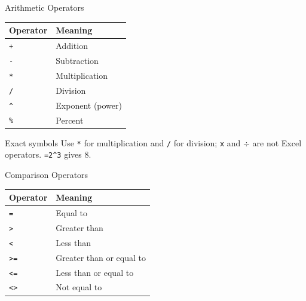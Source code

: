\documentclass[aspectratio=169]{beamer}
\begin{document}
\begin{frame}{Arithmetic Operators}
  \begin{center}
    \begin{tabular}{p{}p{}}
      \toprule
      \textbf{Operator} & \textbf{Meaning} \\
      \midrule
      \texttt{+} & Addition \\
      \texttt{-} & Subtraction \\
      \texttt{*} & Multiplication \\
      \texttt{/} & Division \\
      \texttt{\textasciicircum} & Exponent (power) \\
      \texttt{\%} & Percent \\
      \bottomrule
    \end{tabular}
  \end{center}
  \vspace{0.25cm}
  \begin{alertblock}{Exact symbols}
    Use \texttt{*} for multiplication and \texttt{/} for division;
    \texttt{x} and $\div$ are not Excel operators.
    \texttt{=2\textasciicircum3} gives 8.
  \end{alertblock}
\end{frame}

\begin{frame}{Comparison Operators}
  \begin{center}
    \begin{tabular}{p{}p{}}
      \toprule
      \textbf{Operator} & \textbf{Meaning} \\
      \midrule
      \texttt{=} & Equal to \\
      \texttt{>} & Greater than \\
      \texttt{<} & Less than \\
      \texttt{>=} & Greater than or equal to \\
      \texttt{<=} & Less than or equal to \\
      \texttt{<>} & Not equal to \\
      \bottomrule
    \end{tabular}
  \end{center}
  \vspace{0.25cm}
\end{frame}
\end{document}
